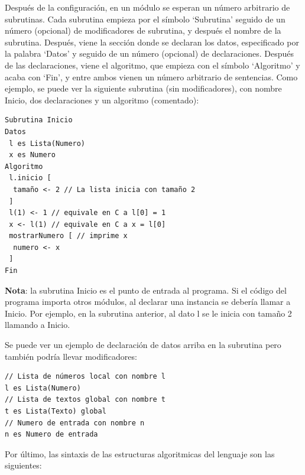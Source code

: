\documentclass{report}
\begin{document}
	Después de la configuración, en un módulo se esperan un número arbitrario de subrutinas. Cada subrutina empieza por el símbolo `Subrutina' seguido de un número (opcional) de modificadores de subrutina, y después el nombre de la subrutina. Después, viene la sección donde se declaran los datos, especificado por la palabra `Datos' y seguido de un número (opcional) de declaraciones. Después de las declaraciones, viene el algoritmo, que empieza con el símbolo `Algoritmo' y acaba con `Fin', y entre ambos vienen un número arbitrario de sentencias. Como ejemplo, se puede ver la siguiente subrutina (sin modificadores), con nombre Inicio, dos declaraciones y un algoritmo (comentado):
	
	\begin{BVerbatim}
Subrutina Inicio
Datos
 l es Lista(Numero)
 x es Numero
Algoritmo
 l.inicio [ 
  tamaño <- 2 // La lista inicia con tamaño 2
 ]
 l(1) <- 1 // equivale en C a l[0] = 1
 x <- l(1) // equivale en C a x = l[0]
 mostrarNumero [ // imprime x
  numero <- x
 ]
Fin	
	\end{BVerbatim}
	
	\vspace{10px}
	\noindent
	\textbf{Nota}: la subrutina Inicio es el punto de entrada al programa. Si el código del programa importa otros módulos, al declarar una instancia se debería llamar a Inicio. Por ejemplo, en la subrutina anterior, al dato l se le inicia con tamaño 2 llamando a Inicio.
	
	\vspace{10px}
	
	Se puede ver un ejemplo de declaración de datos arriba en la subrutina pero también podría llevar modificadores:
	
	\begin{BVerbatim}
// Lista de números local con nombre l 
l es Lista(Numero)
// Lista de textos global con nombre t
t es Lista(Texto) global
// Numero de entrada con nombre n
n es Numero de entrada
	\end{BVerbatim}
	
	\vspace{10px}
	
	Por último, las sintaxis de las estructuras algoritmicas del lenguaje son las siguientes:
	
\end{document}
